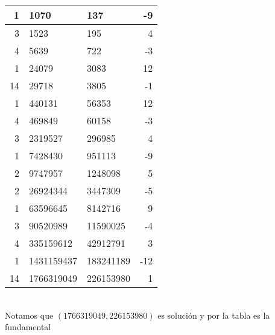 \begin{sol}
\begin{enumerate}[label = (\roman*)]
\begin{tabular}{| r | l | l | r |}
			      1     & 1070       & 137       & -9   \\
			      \hline
			      3     & 1523       & 195       & 4    \\
			      \hline
			      4     & 5639       & 722       & -3   \\
			      \hline
			      1     & 24079      & 3083      & 12   \\
			      \hline
			      14    & 29718      & 3805      & -1   \\
			      \hline
			      1     & 440131     & 56353     & 12   \\
			      \hline
			      4     & 469849     & 60158     & -3   \\
			      \hline
			      3     & 2319527    & 296985    & 4    \\
			      \hline
			      1     & 7428430    & 951113    & -9   \\
			      \hline
			      2     & 9747957    & 1248098   & 5    \\
			      \hline
			      2     & 26924344   & 3447309   & -5   \\
			      \hline
			      1     & 63596645   & 8142716   & 9    \\
			      \hline
			      3     & 90520989   & 11590025  & -4   \\
			      \hline
			      4     & 335159612  & 42912791  & 3    \\
			      \hline
			      1     & 1431159437 & 183241189 & -12  \\
			      \hline
			      14    & 1766319049 & 226153980 & 1    \\
			      \hline
		      \end{tabular}\\
		      Notamos que $(1766319049,226153980)$ es solución y por la tabla es la fundamental


\end{enumerate}
\end{sol}
